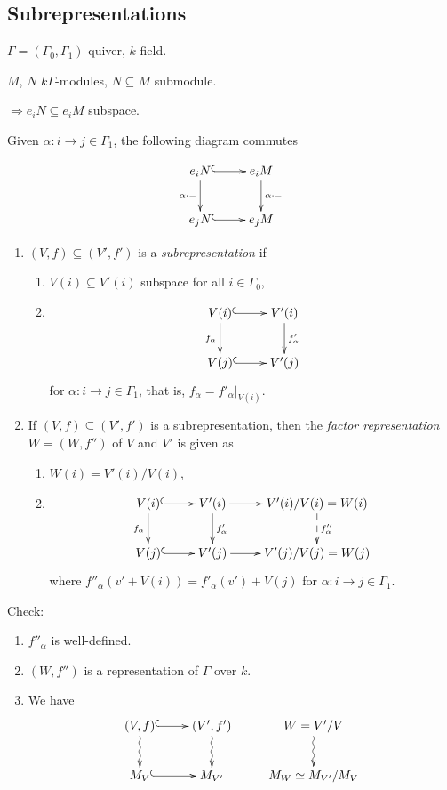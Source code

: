 \subsection{Subrepresentations}

$\Gamma = (\Gamma_0,\Gamma_1)$ quiver, $k$ field.

$M$, $N$ $k\Gamma$-modules, $N\subseteq M$ submodule.

$\Rightarrow e_iN\subseteq e_iM$ subspace.

Given $\alpha\colon i\to j \in \Gamma_1$, the following diagram commutes

\[\xymatrix{
e_i N \ar@{^(->}[r] \ar[d]_{\alpha\cdot-} & e_i M\ar[d]^{\alpha\cdot
  -}\\
e_jN \ar@{^(->}[r] & e_j M
}\]
\begin{defin}
\begin{enumerate}[\rm(a)]
\item $(V,f)\subseteq (V',f')$ is a
\emph{subrepresentation}
if
\begin{enumerate}[\rm(i)]
\item $V(i) \subseteq V'(i)$ subspace for all $i\in\Gamma_0$, 
\item \[\xymatrix{
V(i) \ar@{^(->}[r] \ar[d]_{f_\alpha} & V'(i)\ar[d]^{f'_\alpha}\\
V(j) \ar@{^(->}[r] & V'(j)}\]
for $\alpha\colon i\to j\in\Gamma_1$, that is, $f_\alpha =
f'_\alpha|_{V(i)}$. 
\end{enumerate}
\item If $(V,f)\subseteq (V',f')$ is a subrepresentation, then the
  \emph{factor representation} $W=(W,f'')$ of $V$ and $V'$ is given as
\begin{enumerate}[\rm(i)] 
\item $W(i) = V'(i)/V(i)$, 
\item \[\xymatrix{
V(i) \ar@{^(->}[r] \ar[d]_{f_\alpha} & V'(i)\ar[d]^{f'_\alpha}\ar[r] & V'(i)/V(i)=W(i)\ar@{-->}[d]^{f''_\alpha} \\
V(j) \ar@{^(->}[r] & V'(j) \ar[r] & V'(j)/V(j)=W(j)}\]
where $f''_\alpha(v' + V(i)) = f'_\alpha(v') + V(j)$ for $\alpha\colon
i\to j\in\Gamma_1$. 
\end{enumerate}
\end{enumerate}
\end{defin}
Check: 
\begin{enumerate}[\rm(i)]
\item $f''_{\alpha}$ is well-defined.
\item $(W,f'')$ is a representation of ${\Gamma}$ over $k$. 
\item We have
\[\xymatrix{
(V,f) \ar@{^(->}[r]\ar@{~>}[d] & (V',f') \ar@{~>}[d]&  W = V'/V \ar@{~>}[d] \\
M_V \ar@{^(->}[r] & M_{V'} & M_W \simeq M_{V'}/M_V
}\]
\end{enumerate}

